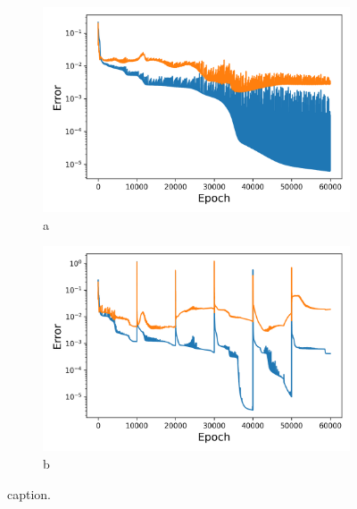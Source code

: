 \blindtext
\begin{figure}[htbp]
	\centering
	\begin{subfigure}{.45\textwidth}
		\centering
		\includegraphics[width=1\linewidth]{./figs/sm_rep_loss_plot.png}  
		\caption{a}
	\end{subfigure}
	\begin{subfigure}{.45\textwidth}
		\centering
		\includegraphics[width=1\linewidth]{./figs/snap_rep_loss_plot.png}  
		\caption{b}
	\end{subfigure}
	\caption{caption.}
\end{figure}
